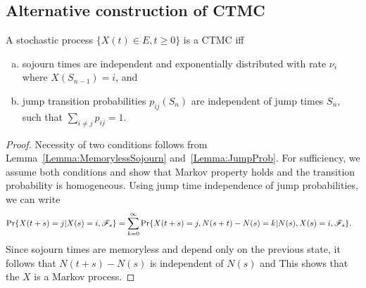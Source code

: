 \documentclass[a4paper,10pt,english]{article}
\begin{document}
\subsection{Alternative construction of CTMC}
\begin{prop} A stochastic process $\{X(t) \in E, t \geqslant 0 \}$ is a CTMC iff 
\begin{enumerate}[a.]
\item sojourn times are independent and exponentially distributed with rate $\nu_i$ where $X(S_{n-1}) = i$, and 
\item jump transition probabilities $p_{ij}(S_n)$ are independent of jump times $S_n$, such that $\sum_{i \neq j}p_{ij}=1$.
\end{enumerate}
\end{prop}
\begin{proof}
Necessity of two conditions follows from Lemma~\ref{Lemma:MemorylessSojourn} and~\ref{Lemma:JumpProb}. 
For sufficiency, we assume both conditions and show that Markov property holds and the transition probability is homogeneous. 
Using jump time independence of jump probabilities, we can write %
\begin{align*}
\Pr\{ X(t+s) = j | X(s) = i, \mathscr{F}_s \} &= \sum_{ k = 0}^{\infty}\Pr\{X(t+s) = j, N(s+t) - N(s) = k | N(s), X(s) = i, \mathscr{F}_s\}.
\end{align*}
Since sojourn times are memoryless and depend only on the previous state, it follows that $N(t+s)-N(s)$ is independent of $N(s)$ and 
This shows that the $X$ is a Markov process. 


\end{proof}
\end{document}
